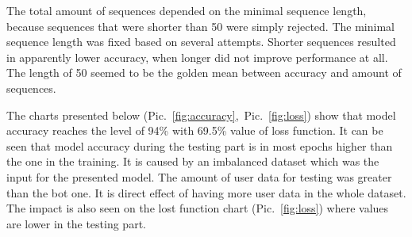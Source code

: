 The total amount of sequences depended on the minimal sequence length, because sequences that were shorter than \num{50} were simply rejected.
The minimal sequence length was fixed based on several attempts.
Shorter sequences resulted in apparently lower accuracy, when longer did not improve performance at all.
The length of \num{50} seemed to be the golden mean between accuracy and amount of sequences.

The charts presented below \mbox{(Pic.~\ref{fig:accuracy}, Pic.~\ref{fig:loss})} show that model accuracy reaches the level of \num{94}\% with \num{69.5}\% value of loss function.
It can be seen that model accuracy during the testing part is in most epochs higher than the one in the training.
It is caused by an imbalanced dataset which was the input for the presented model.
The amount of user data for testing was greater than the bot one.
It is direct effect of having more user data in the whole dataset.
The impact is also seen on the lost function chart \mbox{(Pic.~\ref{fig:loss})} where values are lower in the testing part.

